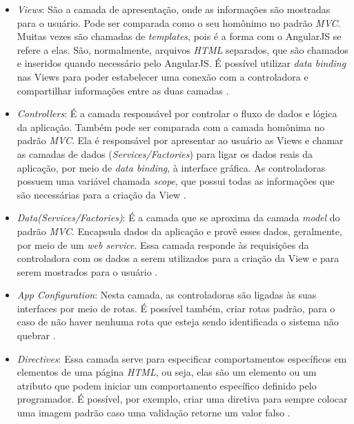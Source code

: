 \begin{itemize}
    \item \textit{Views}: São a camada de apresentação, onde as informações são mostradas para o usuário. Pode ser comparada como 
    o seu homônimo no padrão \textit{MVC}. Muitas vezes são chamadas de \textit{templates}, pois é a forma com o AngularJS 
    se refere a elas. São, normalmente, arquivos \textit{HTML} separados, que são chamados e inseridos quando necessário pelo
    AngularJS. É possível utilizar \textit{data binding} nas Views para poder estabelecer uma conexão com a controladora
    e compartilhar informações entre as duas camadas \cite{drifty_ionic_2016}.
    \item \textit{Controllers}: É a camada responsável por controlar o fluxo de dados e lógica da aplicação. Também pode ser
    comparada com a camada homônima no padrão \textit{MVC}. Ela é responsável por apresentar ao usuário as Views e chamar as camadas
    de dados (\textit{Services/Factories}) para ligar os dados reais da aplicação, por meio de \textit{data binding}, à interface
    gráfica. As controladoras possuem uma variável chamada \textit{scope}, que possui todas as informações que são necessárias 
    para a criação da View \cite{drifty_ionic_2016}.
    \item \textit{Data(Services/Factories)}: É a camada que se aproxima da camada \textit{model} do padrão \textit{MVC}. Encapsula
    dados da aplicação e provê esses dados, geralmente, por meio de um \textit{web service}. Essa camada responde às requisições
    da controladora com os dados a serem utilizados para a criação da View e para serem mostrados para o usuário \cite{drifty_ionic_2016}. 
    \item \textit{App Configuration}: Nesta camada, as controladoras são ligadas às suas interfaces por meio de rotas. É possível
    também, criar rotas padrão, para o caso de não haver nenhuma rota que esteja sendo identificada o sistema não quebrar \cite{drifty_ionic_2016}.
    \item \textit{Directives}: Essa camada serve para especificar comportamentos específicos em elementos de uma página 
    \textit{HTML}, ou seja, elas são um elemento ou um atributo que podem iniciar um comportamento específico definido 
    pelo programador. É possível, por exemplo, criar uma diretiva para sempre colocar uma imagem padrão caso uma validação 
    retorne um valor falso \cite{drifty_ionic_2016}.
\end{itemize}

